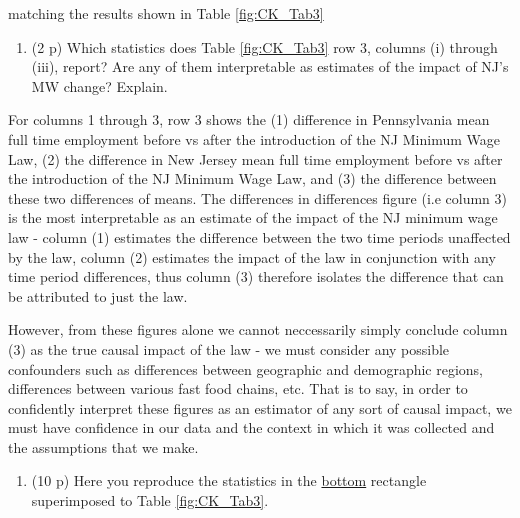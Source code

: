 \documentclass[
]{article}
\providecommand{\tightlist}{%
  \setlength{\itemsep}{0pt}\setlength{\parskip}{0pt}}
\begin{document}
matching the results shown in Table \ref{fig:CK_Tab3}

\begin{enumerate}
\def\labelenumi{\alph{enumi}.}
\setcounter{enumi}{1}
\tightlist
\item
  (2 p) Which statistics does Table \ref{fig:CK_Tab3} row 3, columns (i)
  through (iii), report? Are any of them interpretable as estimates of
  the impact of NJ's MW change? Explain.
\end{enumerate}

For columns 1 through 3, row 3 shows the (1) difference in Pennsylvania
mean full time employment before vs after the introduction of the NJ
Minimum Wage Law, (2) the difference in New Jersey mean full time
employment before vs after the introduction of the NJ Minimum Wage Law,
and (3) the difference between these two differences of means. The
differences in differences figure (i.e column 3) is the most
interpretable as an estimate of the impact of the NJ minimum wage law -
column (1) estimates the difference between the two time periods
unaffected by the law, column (2) estimates the impact of the law in
conjunction with any time period differences, thus column (3) therefore
isolates the difference that can be attributed to just the law.

However, from these figures alone we cannot neccessarily simply conclude
column (3) as the true causal impact of the law - we must consider any
possible confounders such as differences between geographic and
demographic regions, differences between various fast food chains, etc.
That is to say, in order to confidently interpret these figures as an
estimator of any sort of causal impact, we must have confidence in our
data and the context in which it was collected and the assumptions that
we make.

\begin{enumerate}
\def\labelenumi{\arabic{enumi}.}
\setcounter{enumi}{13}
\tightlist
\item
  (10 p) Here you reproduce the statistics in the \underline{bottom}
  rectangle superimposed to Table
  \ref{fig:CK_Tab3}.\label{item:table3-rows-4-5}
\end{enumerate}
\end{document}
